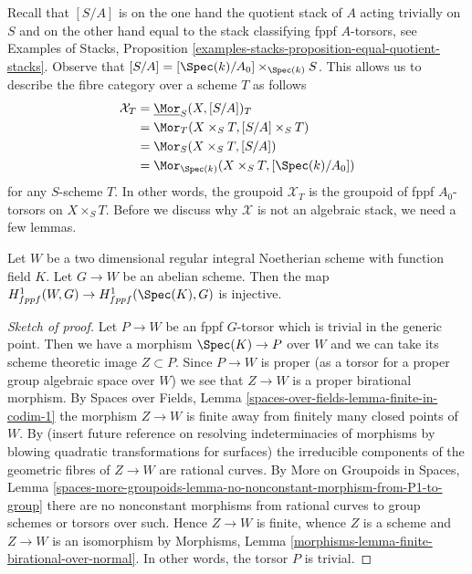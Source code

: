 \medskip\noindent
Recall that $[S/A]$ is on the one hand the quotient stack of $A$ acting
trivially on $S$ and on
the other hand equal to the stack classifying fppf $A$-torsors, see
Examples of Stacks, Proposition
\ref{examples-stacks-proposition-equal-quotient-stacks}.
Observe that $[S/A] = [\Spec(k)/A_0] \times_{\Spec(k)} S$. This allows
us to describe the fibre category over a scheme $T$ as follows
\begin{align*}
\mathcal{X}_T
& =
\underline{\Mor}_S(X, [S/A])_T \\
& =
\Mor_T(X \times_S T, [S/A] \times_S T) \\
& =
\Mor_S(X \times_S T, [S/A]) \\
& =
\Mor_{\Spec(k)}(X \times_S T, [\Spec(k)/A_0])
\end{align*}
for any $S$-scheme $T$. In other words, the groupoid $\mathcal{X}_T$
is the groupoid of fppf $A_0$-torsors on $X \times_S T$.
Before we discuss why $\mathcal{X}$ is not an algebraic stack,
we need a few lemmas.

\begin{lemma}
\label{lemma-torsors-over-two-dimensional-regular}
Let $W$ be a two dimensional regular integral Noetherian scheme
with function field $K$. Let $G \to W$ be an abelian scheme.
Then the map $H^1_{fppf}(W, G) \to H^1_{fppf}(\Spec(K), G)$
is injective.
\end{lemma}

\begin{proof}[Sketch of proof]
Let $P \to W$ be an fppf $G$-torsor which is trivial in the generic point.
Then we have a morphism $\Spec(K) \to P$ over $W$ and we can take
its scheme theoretic image $Z \subset P$. Since $P \to W$ is proper
(as a torsor for a proper group algebraic space over $W$)
we see that $Z \to W$ is a proper birational morphism.
By Spaces over Fields, Lemma \ref{spaces-over-fields-lemma-finite-in-codim-1}
the morphism $Z \to W$ is finite away from finitely many closed points
of $W$. By (insert future reference on resolving indeterminacies
of morphisms by blowing quadratic transformations for surfaces)
the irreducible components of the geometric fibres of $Z \to W$
are rational curves. By
More on Groupoids in Spaces, Lemma
\ref{spaces-more-groupoids-lemma-no-nonconstant-morphism-from-P1-to-group}
there are no nonconstant morphisms from rational curves
to group schemes or torsors over such.
Hence $Z \to W$ is finite, whence $Z$ is a scheme and $Z \to W$
is an isomorphism by
Morphisms, Lemma \ref{morphisms-lemma-finite-birational-over-normal}.
In other words, the torsor $P$ is trivial.
\end{proof}

